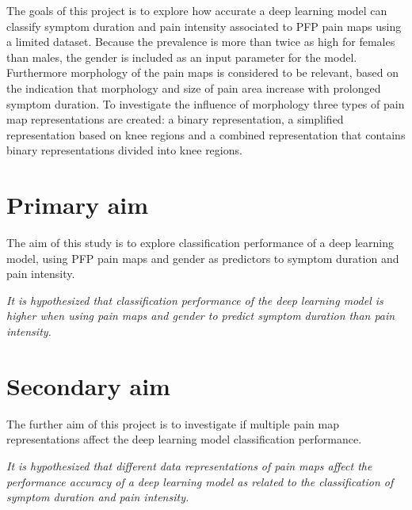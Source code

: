 \noindent
The goals of this project is to explore how accurate a deep learning model can classify symptom duration and pain intensity associated to PFP pain maps using a limited dataset. Because the prevalence is more than twice as high for females than males, the gender is included as an input parameter for the model. 
Furthermore morphology of the pain maps is considered to be relevant, based on the indication that morphology and size of pain area increase with prolonged symptom duration. 
To investigate the influence of morphology three types of pain map representations are created: a binary representation, a simplified representation based on knee regions and a combined representation that contains binary representations divided into knee regions.   

\section{Primary aim}
The aim of this study is to explore classification performance of a deep learning model, using PFP pain maps and gender as predictors to symptom duration and pain intensity. 
\vspace{4mm}
\noindent
\begin{center}
\textit{It is hypothesized that classification performance of the deep learning model is higher when using pain maps and gender to predict symptom duration than pain intensity.}
\end{center}

\section{Secondary aim}
The further aim of this project is to investigate if multiple pain map representations affect the deep learning model classification performance.

\vspace{4mm}
\noindent
\begin{center}
\textit{It is hypothesized that different data representations of pain maps affect the performance
accuracy of a deep learning model as related to the classification of symptom duration and pain intensity.
}
\end{center}










